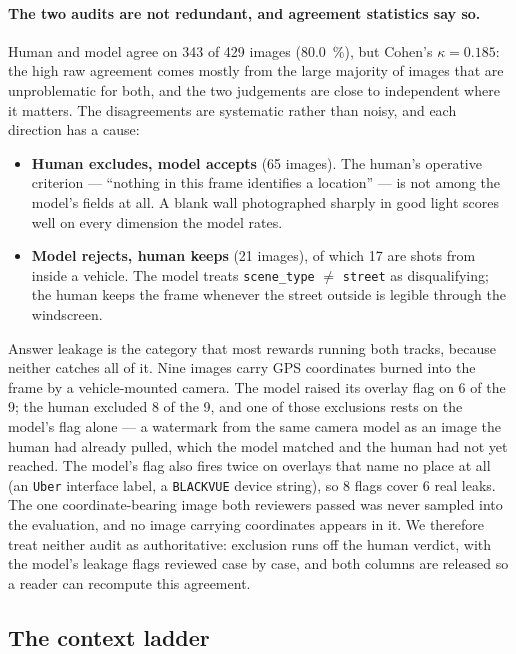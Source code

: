 \documentclass[10pt,a4paper]{article}
\begin{document}
\paragraph{The two audits are not redundant, and agreement statistics say so.}
Human and model agree on \num{343} of \num{429} images (\SI{80.0}{\percent}),
but Cohen's $\kappa = \num{0.185}$: the high raw agreement comes mostly from the
large majority of images that are unproblematic for both, and the two judgements
are close to independent where it matters. The disagreements are systematic
rather than noisy, and each direction has a cause:

\begin{itemize}
  \item \textbf{Human excludes, model accepts} (\num{65} images). The human's
  operative criterion --- ``nothing in this frame identifies a location'' ---
  is not among the model's fields at all. A blank wall photographed sharply in
  good light scores well on every dimension the model rates.
  \item \textbf{Model rejects, human keeps} (\num{21} images), of which
  \num{17} are shots from inside a vehicle. The model treats
  \texttt{scene\_type} $\neq$ \texttt{street} as disqualifying; the human keeps
  the frame whenever the street outside is legible through the windscreen.
\end{itemize}

Answer leakage is the category that most rewards running both tracks, because
neither catches all of it. Nine images carry GPS coordinates burned into the
frame by a vehicle-mounted camera. The model raised its overlay flag on \num{6} of the
\num{9}; the human excluded \num{8} of the \num{9}, and one of those exclusions
rests on the model's flag alone --- a watermark from the same camera model as an
image the human had already pulled, which the model matched and the human had
not yet reached. The model's flag also fires twice on overlays that name no
place at all (an \texttt{Uber} interface label, a \texttt{BLACKVUE} device
string), so \num{8} flags cover \num{6} real leaks. The one coordinate-bearing
image both reviewers passed was never sampled into the evaluation, and no image
carrying coordinates appears in it. We therefore treat neither audit as
authoritative: exclusion runs off the human verdict, with the model's leakage
flags reviewed case by case, and both columns are released so a reader can
recompute this agreement.

\subsection{The context ladder}
\label{sec:ladder}
\end{document}
